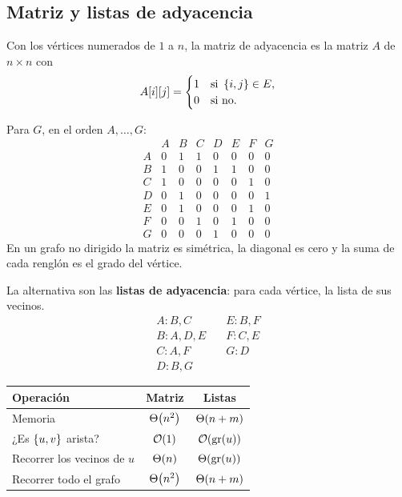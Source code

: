 \documentclass[11pt,letterpaper]{article}
\begin{document}
\subsection*{Matriz y listas de adyacencia}

\begin{definicion}
  Con los vértices numerados de $1$ a $n$, la matriz de adyacencia es
  la matriz $A$ de $n \times n$ con
  \[
    A[i][j] =
    \begin{cases}
      1 & \text{si } \left\{ i, j \right\} \in E , \\
      0 & \text{si no.}
    \end{cases}
  \]
\end{definicion}

Para $G$, en el orden $A, \dots, G$:
\[
  \begin{array}{c|ccccccc}
      & A & B & C & D & E & F & G \\ \hline
    A & 0 & 1 & 1 & 0 & 0 & 0 & 0 \\
    B & 1 & 0 & 0 & 1 & 1 & 0 & 0 \\
    C & 1 & 0 & 0 & 0 & 0 & 1 & 0 \\
    D & 0 & 1 & 0 & 0 & 0 & 0 & 1 \\
    E & 0 & 1 & 0 & 0 & 0 & 1 & 0 \\
    F & 0 & 0 & 1 & 0 & 1 & 0 & 0 \\
    G & 0 & 0 & 0 & 1 & 0 & 0 & 0
  \end{array}
\]
En un grafo no dirigido la matriz es simétrica, la diagonal es cero
y la suma de cada renglón es el grado del vértice.

La alternativa son las \textbf{listas de adyacencia}: para cada vértice,
la lista de sus vecinos.
\[
  \begin{array}{ll}
    A: B, C & \quad E: B, F \\
    B: A, D, E & \quad F: C, E \\
    C: A, F & \quad G: D \\
    D: B, G &
  \end{array}
\]

\begin{center}
\small
\begin{tabular}{lcc}
  \toprule
  \textbf{Operación} & \textbf{Matriz} & \textbf{Listas} \\
  \midrule
  Memoria & $\Theta\!\left(n^2\right)$ & $\Theta\!\left(n + m\right)$ \\
  ¿Es $\left\{ u, v \right\}$ arista? & $\mathcal{O}\!\left(1\right)$ & $\mathcal{O}\!\left(\text{gr}(u)\right)$ \\
  Recorrer los vecinos de $u$ & $\Theta\!\left(n\right)$ & $\Theta\!\left(\text{gr}(u)\right)$ \\
  Recorrer todo el grafo & $\Theta\!\left(n^2\right)$ & $\Theta\!\left(n + m\right)$ \\
  \bottomrule
\end{tabular}
\end{center}
\end{document}
